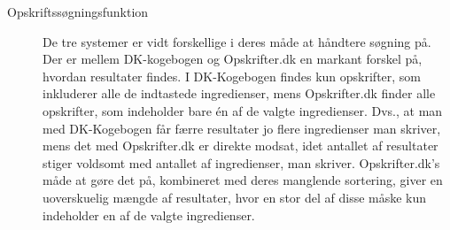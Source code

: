 \begin{description}
\item[Opskriftssøgningsfunktion]
De tre systemer er vidt forskellige i deres måde at håndtere søgning på. Der er mellem DK-kogebogen og Opskrifter.dk en markant forskel på, hvordan resultater findes. I DK-Kogebogen findes kun opskrifter, som inkluderer alle de indtastede ingredienser, mens Opskrifter.dk finder alle opskrifter, som indeholder bare én af de valgte ingredienser. Dvs., at man med DK-Kogebogen får færre resultater jo flere ingredienser man skriver, mens det med Opskrifter.dk er direkte modsat, idet antallet af resultater stiger voldsomt med antallet af ingredienser, man skriver. Opskrifter.dk’s måde at gøre det på, kombineret med deres manglende sortering, giver en uoverskuelig mængde af resultater, hvor en stor del af disse måske kun indeholder en af de valgte ingredienser.
\end{description}





